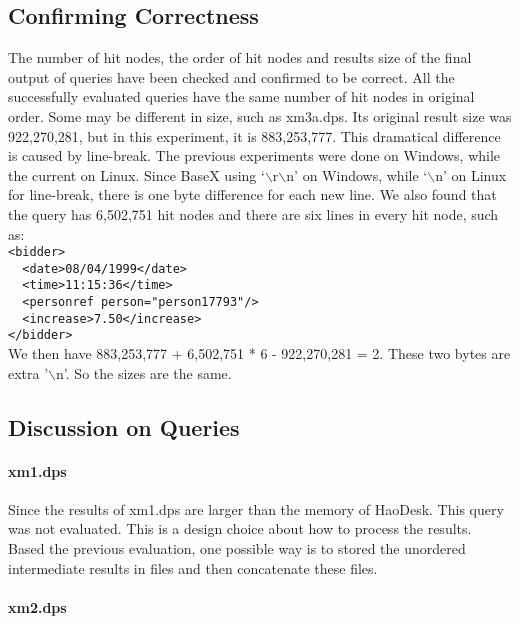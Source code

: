 \subsection{Confirming Correctness}

The number of hit nodes, the order of hit nodes and results size of
the final output of queries have been checked and confirmed to be correct. 
All the successfully evaluated queries 
have the same number of hit nodes in original order. Some may be 
different in size, such as xm3a.dps. Its original result size
was 922,270,281, but in this experiment, it is 883,253,777.
This dramatical difference is caused by line-break. The previous 
experiments were done on Windows, while the current on Linux. 
Since BaseX using `$\backslash$r$\backslash$n' on Windows, while
 `$\backslash$n' on Linux for line-break, there is one byte 
difference for each new line. We also found that the query has 
6,502,751 hit nodes and  there are six lines in every hit node, 
such as:\\
\verb|<bidder>|\\
\verb|  <date>08/04/1999</date>|\\

\verb|  <time>11:15:36</time>|\\
\verb|  <personref person="person17793"/>|\\
\verb|  <increase>7.50</increase>|\\
\verb|</bidder>|\\

We then have 883,253,777 + 6,502,751 * 6 - 922,270,281 = 2. These two bytes
are extra '$\backslash$n'. So the sizes are the same.



\subsection{Discussion on Queries}


\paragraph{xm1.dps}

Since the results of xm1.dps are larger than the memory of 
HaoDesk. This query was not evaluated. This is a design 
choice about how to process the results. Based the previous 
evaluation, one possible way is to stored the unordered intermediate 
results in files and then concatenate these files.

\paragraph{xm2.dps}

